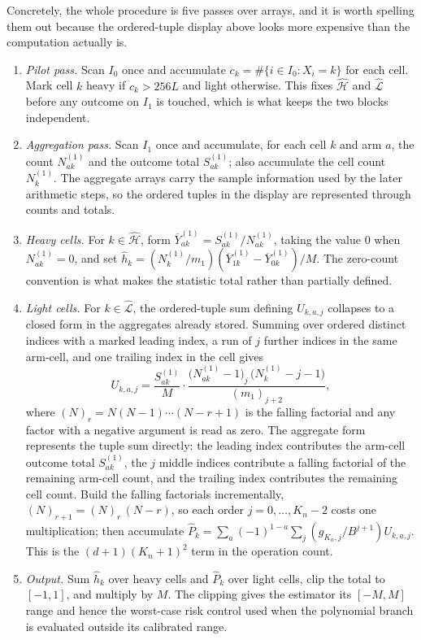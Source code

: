 \documentclass[11pt]{article}
\begin{document}
Concretely, the whole procedure is five passes over arrays, and it is worth spelling them out because the ordered-tuple display above looks more expensive than the computation actually is.
\begin{enumerate}
\item \emph{Pilot pass.} Scan \(I_0\) once and accumulate \(c_k=\#\{i\in I_0:X_i=k\}\) for each cell. Mark cell \(k\) heavy if \(c_k>256L\) and light otherwise. This fixes \(\widehat{\mathcal H}\) and \(\widehat{\mathcal L}\) before any outcome on \(I_1\) is touched, which is what keeps the two blocks independent.
\item \emph{Aggregation pass.} Scan \(I_1\) once and accumulate, for each cell \(k\) and arm \(a\), the count \(N_{ak}^{(1)}\) and the outcome total \(S_{ak}^{(1)}\); also accumulate the cell count \(N_k^{(1)}\). The aggregate arrays carry the sample information used by the later arithmetic steps, so the ordered tuples in the display are represented through counts and totals.
\item \emph{Heavy cells.} For \(k\in\widehat{\mathcal H}\), form \(\overline Y_{ak}^{(1)}=S_{ak}^{(1)}/N_{ak}^{(1)}\), taking the value \(0\) when \(N_{ak}^{(1)}=0\), and set \(\widehat h_k=(N_k^{(1)}/m_1)(\overline Y_{1k}^{(1)}-\overline Y_{0k}^{(1)})/M\). The zero-count convention is what makes the statistic total rather than partially defined.
\item \emph{Light cells.} For \(k\in\widehat{\mathcal L}\), the ordered-tuple sum defining \(U_{k,a,j}\) collapses to a closed form in the aggregates already stored. Summing over ordered distinct indices with a marked leading index, a run of \(j\) further indices in the same arm-cell, and one trailing index in the cell gives
\[
U_{k,a,j}
=
\frac{S_{ak}^{(1)}}{M}\cdot
\frac{\bigl(N_{ak}^{(1)}-1\bigr)_{j}\,\bigl(N_k^{(1)}-j-1\bigr)}{(m_1)_{j+2}},
\]
where \((N)_r=N(N-1)\cdots(N-r+1)\) is the falling factorial and any factor with a negative argument is read as zero. The aggregate form represents the tuple sum directly: the leading index contributes the arm-cell outcome total \(S_{ak}^{(1)}\), the \(j\) middle indices contribute a falling factorial of the remaining arm-cell count, and the trailing index contributes the remaining cell count. Build the falling factorials incrementally, \((N)_{r+1}=(N)_r\,(N-r)\), so each order \(j=0,\ldots,K_n-2\) costs one multiplication; then accumulate \(\widehat P_k=\sum_a(-1)^{1-a}\sum_j (g_{K_n,j}/B^{j+1})U_{k,a,j}\). This is the \((d+1)(K_n+1)^2\) term in the operation count.
\item \emph{Output.} Sum \(\widehat h_k\) over heavy cells and \(\widehat P_k\) over light cells, clip the total to \([-1,1]\), and multiply by \(M\). The clipping gives the estimator its \([-M,M]\) range and hence the worst-case risk control used when the polynomial branch is evaluated outside its calibrated range.
\end{enumerate}
\end{document}
